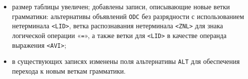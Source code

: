 \documentclass[a4paper,14pt]{extarticle}
\begin{document}
\begin{itemize}
  \item размер таблицы увеличен; добавлены записи, описывающие новые
        ветки грамматики: альтернативы объявлений \texttt{ODC} без разрядности
        с использованием нетерминала \texttt{<LID>}, ветка распознавания
        нетерминала \texttt{<ZNL>} для знака логической операции «\texttt{=}»,
        а также ветки для \texttt{<LID>} в качестве операнда выражения
        \texttt{<AVI>};
  \item в существующих записях изменены поля альтернативы \texttt{ALT}
        для обеспечения перехода к новым веткам грамматики.
\end{itemize}
\end{document}
